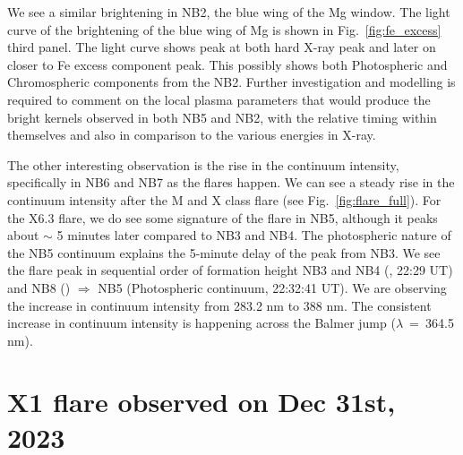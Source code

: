 We see a similar brightening in NB2, the blue wing of the Mg window. The light curve of the brightening of the blue wing of Mg is shown in Fig.~\ref{fig:fe_excess} third panel. The light curve shows peak at both hard X-ray peak and later on closer to Fe excess component peak. This possibly shows both Photospheric and Chromospheric components from the NB2. Further investigation and modelling is required to comment on the local plasma parameters that would produce the bright kernels observed in both NB5 and NB2, with the relative timing within themselves and also in comparison to the various energies in X-ray.

The other interesting observation is the rise in the continuum intensity, specifically in NB6 and NB7 as the flares happen. We can see a steady rise in the continuum intensity after the M and X class flare (see Fig.~\ref{fig:flare_full}). For the X6.3 flare, we do see some signature of the flare in NB5, although it peaks about $\sim$ 5 minutes later compared to NB3 and NB4. The photospheric nature of the NB5 continuum explains the 5-minute delay of the peak from NB3. We see the flare peak in sequential order of formation height NB3 and NB4 (, 22:29 UT) and NB8 () $\Longrightarrow$ NB5 (Photospheric continuum, 22:32:41 UT). We are observing the increase in continuum intensity from 283.2 nm to 388 nm. The consistent increase in continuum intensity is happening across the Balmer jump ($\lambda$~=~364.5 nm).

\section{X1 flare observed on Dec 31st, 2023} \label{sec:dec_31st}

